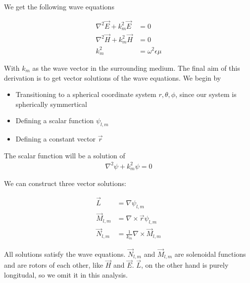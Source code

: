             We get the following wave equations

            \begin{align}
                \nabla^2\vec{E} + k^2_m\vec{E} &= 0 \label{mie:waveE}\\
                \nabla^2\vec{H} + k^2_m\vec{H} &= 0 \label{mie:waveH}\\
                k^2_m &= \omega^2\epsilon\mu \label{mie:kvec}
            \end{align}

            With $k_m$ as the wave vector in the surrounding medium. The final aim of this derivation is to get vector solutions
            of the wave equations. We begin by
            \begin{itemize}
                \item Transitioning to a spherical coordinate system ${r, \theta, \phi}$, since our system is spherically symmertical
                \item Defining a scalar function $\psi_{l,m}$
                \item Defining a constant vector $\vec{r}$
            \end{itemize}

            The scalar function will be a solution of
            \begin{align}
                \nabla^2\psi + k^2_m\psi = 0 \label{mie:scalar}
            \end{align}

            We can construct three vector solutions:

            \begin{align}
                \vec{L} &= \nabla\psi_{l,m} \\
                \vec{M}_{l,m} &= \nabla\times\vec{r}\psi_{l,m} \\
                \vec{N}_{l,m} &= \frac{1}{k_m}\nabla\times\vec{M}_{l,m}
            \end{align}

            All solutions satisfy the wave equations. $\vec{N}_{l,m}$ and $\vec{M}_{l,m}$ are solenoidal functions and are rotors of each other,
            like $\vec{H}$ and $\vec{E}$. $\vec{L}$, on the other hand is purely longitudal, so we omit it in this analysis.

        \subsubsection{}

